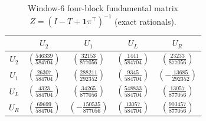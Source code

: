 \begin{table}[H]
\centering
\scriptsize
\setlength{\tabcolsep}{6pt}
\caption{Window-6 four-block fundamental matrix $Z=(I-T+\mathbf 1\pi^\top)^{-1}$ (exact rationals).}
\label{tab:window6_green_kernel_Z}
\begin{tabular}{c c c c c}
\toprule
 & $U_2$ & $U_1$ & $U_L$ & $U_R$ \\
\midrule
$U_2$ & $(\frac{546339}{584704})$ & $(\frac{32153}{877056})$ & $(\frac{1441}{584704})$ & $(\frac{23233}{877056})$ \\
$U_1$ & $(\frac{26307}{584704})$ & $(\frac{288211}{292352})$ & $(\frac{9345}{584704})$ & $(-\frac{13685}{292352})$ \\
$U_L$ & $(\frac{4323}{584704})$ & $(\frac{34265}{877056})$ & $(\frac{548833}{584704})$ & $(\frac{13057}{877056})$ \\
$U_R$ & $(\frac{69699}{584704})$ & $(-\frac{150535}{877056})$ & $(\frac{13057}{584704})$ & $(\frac{903457}{877056})$ \\
\bottomrule
\end{tabular}
\end{table}
